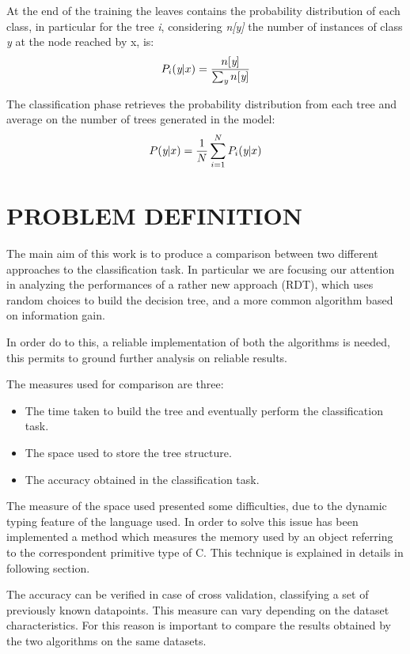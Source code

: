 \documentclass{acm_proc_article-sp-sigmod07}
\begin{document}
At the end of the training the leaves contains the probability distribution
of each class, in particular for the tree \emph{i}, considering
\emph{n[y]} the number of instances of class \emph{y} at the node reached
by x, is:
\begin{equation}
\label{formula:probability_tree}
	P_i(\emph{y}|x) = \frac{n[\emph{y}]}{\sum_\emph{y} n[\emph{y}]}
\end{equation}

The classification phase retrieves the probability distribution from each
tree and average on the number of trees generated in the model:
\begin{equation}
\label{formula:probability_forest}
	P(\emph{y}|x) = \frac{1}{N} \sum_{i=1}^N P_i(\emph{y}|x)
\end{equation}


\section{PROBLEM DEFINITION}
The main aim of this work is to produce a comparison between two different
approaches to the classification task. In particular we are focusing our
attention in analyzing the performances of a rather new approach (RDT),
which uses random choices to build the decision tree, and a more common
algorithm based on information gain.

In order do to this, a reliable implementation of both the algorithms is
needed, this permits to ground further analysis on reliable results.

The measures used for comparison are three:
\begin{itemize}
\item The time taken to build the tree and eventually perform the
classification task.
\item The space used to store the tree structure.
\item The accuracy obtained in the classification task.
\end{itemize}

The measure of the space used presented some difficulties, due to the
dynamic typing feature of the language used. In order to solve this issue
has been implemented a method which measures the memory used by an object
referring to the correspondent primitive type of C. This technique is
explained in details in following section.

The accuracy can be verified in case of cross validation, classifying a
set of previously known datapoints. This measure can vary depending on the
dataset characteristics. For this reason is important to compare the
results obtained by the two algorithms on the same datasets.
\end{document}
